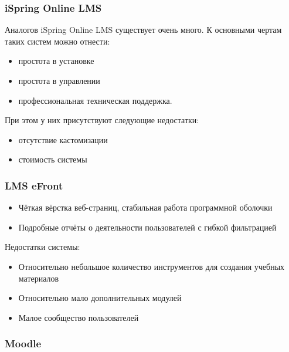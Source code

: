 \documentclass[a4paper,14pt]{article}
\begin{document}

\subsubsection{iSpring Online LMS}

Аналогов iSpring Online LMS существует очень много.
К основными чертам таких систем можно отнести:
\begin{itemize}
	\item простота в установке
	\item простота в управлении	
	\item профессиональная техническая поддержка.
\end{itemize}

При этом у них присутствуют следующие недостатки:
\begin{itemize}
	\item отсутствие кастомизации
	\item стоимость системы
\end{itemize} 

\subsubsection{LMS eFront }

\begin{itemize}
	\item Чёткая вёрстка веб-страниц, стабильная работа программной оболочки 
	\item Подробные отчёты о деятельности пользователей с гибкой фильтрацией	
	
\end{itemize} 

Недостатки системы:

\begin{itemize}
	\item Относительно небольшое количество инструментов для создания учебных материалов
	\item Относительно мало дополнительных модулей
	\item Малое сообщество пользователей
	
	
\end{itemize} 

\subsubsection{Moodle}
\end{document}
